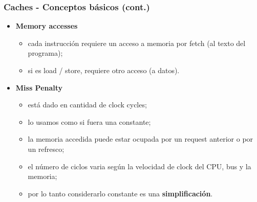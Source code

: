 \documentclass{beamer}
\begin{document}
 

   \begin{frame}
   \frametitle{Caches - Conceptos básicos (cont.)}
    \begin{itemize}
      \item \textbf{Memory accesses}
      \begin{itemize}
        \item cada instrucción requiere un acceso a memoria por fetch (al texto del programa);
	     \item si es load / store, requiere otro acceso (a datos).
       \end{itemize}
           
           \bigskip
      \item \textbf{Miss Penalty}
      \begin{itemize}
        \item está dado en cantidad de clock cycles;
        \item lo usamos como si fuera una constante;
        \item la memoria accedida puede estar ocupada por un request anterior o
	por un refresco;
        \item el número de ciclos varia según la velocidad de clock del CPU, bus
	y la memoria;
	     \item por lo tanto considerarlo constante es una \textbf{simplificación}.
      \end{itemize}
    \end{itemize}
  \end{frame}
\end{document}
